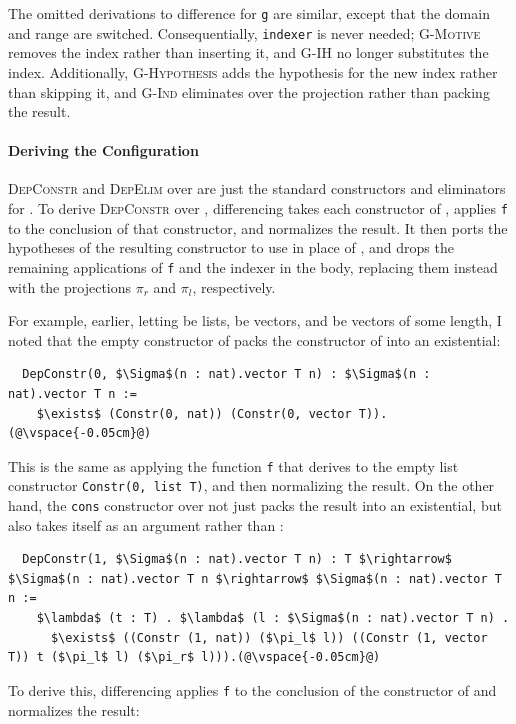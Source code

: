 The omitted derivations to difference for \lstinline{g} are similar,
except that the domain and range are switched. Consequentially, \lstinline{indexer} is never needed;
\textsc{G-Motive} removes the index rather than inserting it, and \textsc{G-IH} no longer substitutes the index.
Additionally, \textsc{G-Hypothesis} adds the hypothesis for the new index
rather than skipping it, and \textsc{G-Ind} eliminates over the projection rather than packing the result. %

\paragraph{Deriving the Configuration}
\textsc{DepConstr} and \textsc{DepElim} over \Aa are just the standard constructors and eliminators for \Aa.
To derive \textsc{DepConstr} over \B, differencing takes each constructor of \Aa,
applies \lstinline{f} to the conclusion of that constructor, and normalizes the result. %
It then ports the hypotheses of the resulting constructor to use \B in place of \Aa, and drops the remaining applications of \lstinline{f}
and the indexer in the body, replacing them instead with the projections $\pi_r$ and $\pi_l$, respectively.

For example, earlier, letting \Aa be lists, \AI be vectors, and \B be vectors of some length,
I noted that the empty constructor of \B packs the constructor of \AI into an existential:

\begin{lstlisting}
  DepConstr(0, $\Sigma$(n : nat).vector T n) : $\Sigma$(n : nat).vector T n :=
    $\exists$ (Constr(0, nat)) (Constr(0, vector T)).(@\vspace{-0.05cm}@)
\end{lstlisting}
This is the same as applying the function \lstinline{f} that \toolnamec derives to the empty list constructor 
\lstinline{Constr(0, list T)}, and then normalizing the result.
On the other hand, the \lstinline{cons} constructor over \B not just packs the result into an existential,
but also takes \B itself as an argument rather than \Aa:

\begin{lstlisting}
  DepConstr(1, $\Sigma$(n : nat).vector T n) : T $\rightarrow$ $\Sigma$(n : nat).vector T n $\rightarrow$ $\Sigma$(n : nat).vector T n :=
    $\lambda$ (t : T) . $\lambda$ (l : $\Sigma$(n : nat).vector T n) .
      $\exists$ ((Constr (1, nat)) ($\pi_l$ l)) ((Constr (1, vector T)) t ($\pi_l$ l) ($\pi_r$ l))).(@\vspace{-0.05cm}@)
\end{lstlisting}
To derive this, differencing applies \lstinline{f} to the conclusion of the constructor of \Aa and normalizes the result:


